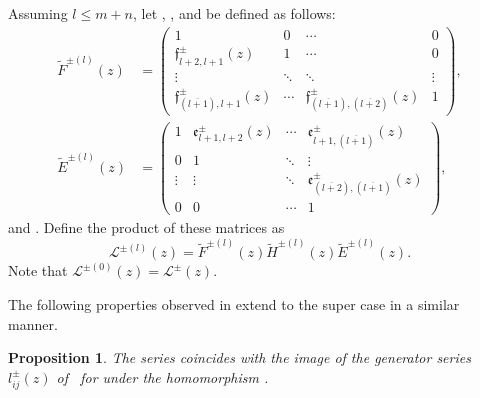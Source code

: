 \documentclass[10pt,a4paper]{amsart}
\numberwithin{equation}{section}
\newtheorem{Proposition}[Theorem]{Proposition}
 { \theoremstyle{definition}
\newtheorem{Definition}[Theorem]{Definition}
\newtheorem{Note}[Theorem]{Note}
\newtheorem{Example}[Theorem]{Example}
\newtheorem{Remark}[Theorem]{Remark} }
\begin{document}
Assuming $l\leq m+n$, let , , and  be defined as follows:
\begin{align*}
\widetilde{F}^{\pm (l)}(z) &= \left(
 \begin{matrix}
 1 & 0 & \cdots & 0 \\
 \mathfrak{f}_{l+2,l+1}^{\pm}(z) & 1 & \cdots & 0 \\
 \vdots & \ddots & \ddots & \vdots \\
 \mathfrak{f}_{(\overline{l+1}),l+1}^{\pm}(z) & \cdots & \mathfrak{f}_{(\overline{l+1}),(\overline{l+2})}^{\pm}(z) & 1
 \end{matrix}\right),\\
 \widetilde{E}^{\pm (l)}(z) &= \left(\begin{matrix}
 1 & \mathfrak{e}_{l+1,l+2}^{\pm}(z) & \cdots & \mathfrak{e}_{l+1,(\overline{l+1})}^{\pm}(z) \\
 0 & 1 & \ddots& \vdots \\
 \vdots & \vdots & \ddots &\mathfrak{e}_{(\overline{l+2}),(\overline{l+1})}^{\pm}(z) \\
 0& 0 & \cdots & 1
 \end{matrix}\right),
\end{align*}
and . Define the product of these matrices as
\begin{equation*}
 \mathcal{L}^{\pm (l)}(z)=\widetilde{F}^{\pm (l)}(z)\widetilde{H}^{\pm (l)}(z)\widetilde{E}^{\pm (l)}(z).
\end{equation*}
Note that $ \mathcal{L}^{\pm (0)}(z)=\mathcal{L}^{\pm }(z)$.

The following properties observed in \cite[Proposition 4.2]{JMA} extend to the super case in a similar manner.
\begin{Proposition}\label{pr2}
The series  coincides with the image of the generator series $ l^{\pm }_{ij}(z)$ of~ for  under the homomorphism
.
\end{Proposition}
\end{document}
